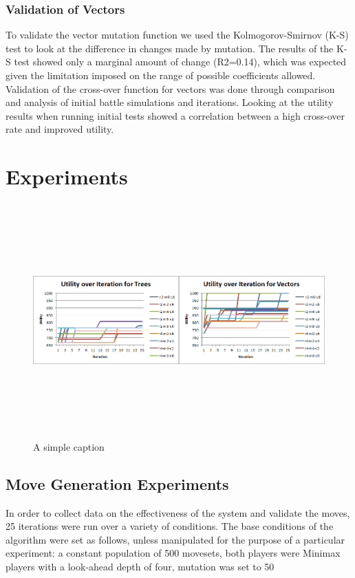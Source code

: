 \documentclass{acm_proc_article-sp}
\begin{document}
    \subsubsection{Validation of Vectors}
    To validate the vector mutation function we used the Kolmogorov-Smirnov (K-S)  test to look at the difference in changes made by mutation. The results of the K-S test showed only a marginal amount of change (R2=0.14), which was expected given the limitation imposed on the range of possible coefficients allowed.
    Validation of the cross-over function for vectors was done through comparison and analysis of initial battle simulations and iterations. Looking at the utility results when running initial tests showed a correlation between a high cross-over rate and improved utility.
    
    
    \section{Experiments}

\begin{figure}[ht!]
\centering
\includegraphics[width=\textwidth,height=90mm,keepaspectratio]{./images/gen-mureco-comparison.png}
\caption{A simple caption}
\label{utility_experiments}
\end{figure}
    
    \subsection{Move Generation Experiments}

In order to collect data on the effectiveness of the system and validate the moves, 25 iterations were run over a variety of conditions. The base conditions of the algorithm were set as follows, unless manipulated for the purpose of a particular experiment: a constant population of 500 movesets, both players were Minimax players with a look-ahead depth of four, mutation was set to 50%
\end{document}
